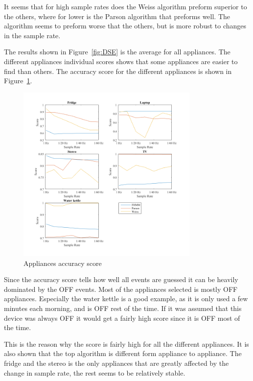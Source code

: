 It seems that for high sample rates does the Weiss algorithm preform superior to the others, where for lower is the Parson algorithm that preforms well. The  algorithm seems to preform worse that the others, but is more robust to changes in the sample rate. 

The results shown in Figure~\ref{fig:DSE} is the average for all appliances. The different appliances individual scores shows that some appliances are easier to find than others. The accuracy score for the different appliances is shown in Figure~\ref{fig:AccGS}. 

\begin{figure}[H]
\centering
\includegraphics[width=0.8\textwidth]{billeder/App-AccuracyScore.png}
\caption{Appliances accuracy score}
\label{fig:AccGS}
\end{figure}

Since the accuracy score tells how well all events are guessed it can be heavily dominated by the OFF events. Most of the appliances selected is mostly OFF appliances. Especially the water kettle is a good example, as it is only used a few minutes each morning, and is OFF rest of the time. If it was assumed that this device was always OFF it would get a fairly high score since it is OFF most of the time.  

This is the reason why the score is fairly high for all the different appliances. It is also shown that the top algorithm is different form appliance to appliance. The fridge and the stereo is the only appliances that are greatly affected by the change in sample rate, the rest seems to be  relatively stable.

